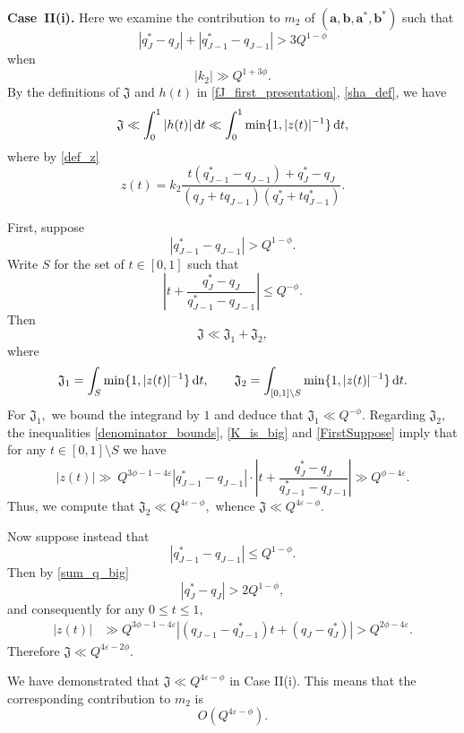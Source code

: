 \documentclass[12pt, reqno]{amsart}
\theoremstyle{definition}
\theoremstyle{remark}
\numberwithin{equation}{section}
\def\eps{\varepsilon}
\def\le{\leqslant} \def\ge{\geqslant}
\def\d{{\,{\rm d}}}
\def \ba {\mathbf a}
\def \bb {\mathbf b}
\def \fJ {\mathfrak J}
\begin{document}
\bigskip 

\textbf{Case~II(i).} Here we examine the contribution to $m_2$ of $(\ba,\bb,\ba^*,\bb^*)$ such that 
\begin{equation}\label{sum_q_big}
|q_J^* - q_J| +
|q_{J-1}^* - q_{J-1}| 
> 3Q^{1- \phi} 
\end{equation}
when
\begin{equation} \label{K_is_big}
|k_2| \gg Q^{1 + 3\phi}.
\end{equation}
By the definitions of $\fJ$ and $h(t)$ in \eqref{fJ_first_presentation}, \eqref{sha_def}, we have
\[ \fJ \ll  \int_0^1 |h(t)|\d t \ll  \int_0^1 \min
\{ 1, |z(t)|^{-1} \} \d t, \]
where by \eqref{def_z}
\[
z(t) = k_2
\frac{t(q_{J-1}^* - q_{J-1})
+ q_J^* - q_J}
{(q_J + tq_{J-1})
(q_J^* + tq_{J-1}^*)}.
\]

First, suppose
\begin{equation} \label{FirstSuppose}
|q_{J-1}^* - q_{J-1}| > Q^{1-\phi}.
\end{equation}
Write $S$ for the set of $t \in [0,1]$ such that
\[
\left| t + 
\frac{q_J^* - q_J}
{q_{J-1}^* - q_{J-1}}
\right| \le Q^{- \phi}.
\]
Then
\[
\fJ \ll \fJ_1 + \fJ_2,
\]
where
\[
\fJ_1 = \int_S 
\min
\{ 1, |z(t)|^{-1} \} \d t,
\qquad
\fJ_2 = \int_{[0,1]\setminus S}
\min
\{ 1, |z(t)|^{-1} \} \d t.
\]
For $\fJ_1,$ we bound the integrand by $1$ and deduce that $\fJ_1 \ll Q^{-\phi}.$ Regarding $\fJ_2,$ the inequalities \eqref{denominator_bounds},
\eqref{K_is_big} and \eqref{FirstSuppose} imply that for any $t\in [0,1] \setminus S$ we have 
\[
|z(t)| \gg \: Q^{3\phi - 1 - 4\eps}
|q_{J-1}^* - q_{J-1}| \cdot
\left| t + 
\frac{q_J^* - q_J}
{q_{J-1}^* - q_{J-1}} 
\right| \gg Q^{\phi - 4\varepsilon}. 
\]
Thus, we compute that
$ \fJ_2 \ll Q^{4 \eps - \phi},$
whence $\fJ \ll   Q^{4 \eps - \phi}.$


Now suppose instead that
\begin{equation} \label{Case_2i_subcase_one}
|q_{J-1}^* - q_{J-1}| \le Q^{1 - \phi}.
\end{equation}
Then by  \eqref{sum_q_big}
\[
|q_J^* - q_J| > 2Q^{1 - \phi},
\]
and consequently for any $0 \le t \le 1,$
\[ \begin{split}
|z(t)| &\gg  Q^{3\phi - 1 - 4 \eps} |(q_{J-1}-q_{J-1}^*)t +(q_J-q_J^*)|
> Q^{2 \phi - 4\eps}.
\end{split}
\]
Therefore 
$\fJ \ll Q^{ 4\eps - 2 \phi}$.

We have demonstrated that $\fJ \ll Q^{4\eps - \phi}$ in Case II(i). This means that the corresponding contribution to $m_2$ is 
\begin{equation} 
\label{Contribution21}
O(Q^{4 \eps - \phi}).
\end{equation}
\end{document}
